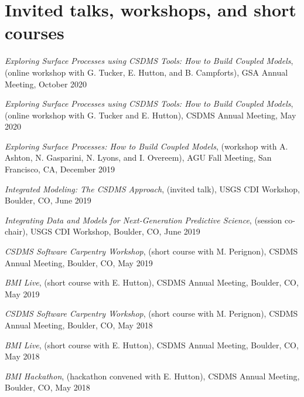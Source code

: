 \section{Invited talks, workshops, and short courses}
\vspace{0.5em}

\begin{enumerate}[{[}1{]}]

  \item \textit{Exploring Surface Processes using CSDMS Tools: How to
    Build Coupled Models}, (online workshop with G. Tucker, E. Hutton,
    and B. Campforts), GSA Annual Meeting, October 2020

  \item \textit{Exploring Surface Processes using CSDMS Tools: How to
    Build Coupled Models}, (online workshop with G. Tucker and
    E. Hutton), CSDMS Annual Meeting, May 2020

  \item \textit{Exploring Surface Processes: How to Build Coupled
    Models}, (workshop with A. Ashton, N. Gasparini, N. Lyons, and
    I. Overeem), AGU Fall Meeting, San Francisco, CA, December 2019

  \item \textit{Integrated Modeling: The CSDMS Approach}, (invited
    talk), USGS CDI Workshop, Boulder, CO, June 2019

  \item \textit{Integrating Data and Models for Next-Generation
    Predictive Science}, (session co-chair), USGS CDI Workshop,
    Boulder, CO, June 2019
    
  \item \textit{CSDMS Software Carpentry Workshop}, (short course with
    M. Perignon), CSDMS Annual Meeting, Boulder, CO, May 2019

  \item \textit{BMI Live}, (short course with E. Hutton),
    CSDMS Annual Meeting, Boulder, CO, May 2019

  \item \textit{CSDMS Software Carpentry Workshop}, (short course with
    M. Perignon), CSDMS Annual Meeting, Boulder, CO, May 2018

  \item \textit{BMI Live}, (short course with E. Hutton),
    CSDMS Annual Meeting, Boulder, CO, May 2018

  \item \textit{BMI Hackathon}, (hackathon convened with E. Hutton),
    CSDMS Annual Meeting, Boulder, CO, May 2018


\end{enumerate}
